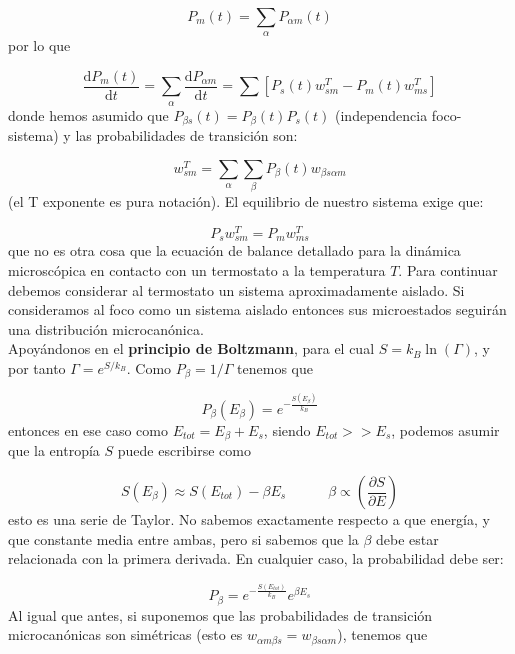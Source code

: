 \documentclass[12pt,a4paper]{article}
\numberwithin{equation}{section}
\numberwithin{figure}{section}
\newcommand{\tquad}{\quad \quad \quad}
\newcommand{\parentesis}[1]{\left( #1  \right)}
\newcommand{\parciales}[2]{\frac{\partial #1}{\partial #2}}
\newcommand{\pparciales}[2]{\parentesis{\parciales{#1}{#2}}}
\newcommand{\ccorchetes}[1]{\left[ #1  \right]}
\newcommand{\D}{\mathrm{d}}
\newcommand{\derivadas}[2]{\frac{\D #1}{\D #2}}
\theoremstyle{definition}
\begin{document}
\begin{equation}
P_m (t) = \sum_\alpha P_{\alpha m} (t)
\end{equation}
por lo que

\begin{equation}
\derivadas{P_m(t)}{t} = \sum_{\alpha} \derivadas{P_{\alpha m}}{t} = \sum \ccorchetes{P_s(t) w_{sm}^T - P_m (t) w_{ms}^T}
\end{equation}
donde hemos asumido  que $P_{\beta s} (t) = P_\beta (t) P_s (t)$ (independencia foco-sistema) y las probabilidades de transición son:

\begin{equation}
w_{sm}^T = \sum_\alpha \sum_\beta P_\beta (t) w_{\beta s \alpha m}
\end{equation}
(el T exponente es pura notación). El equilibrio de nuestro sistema exige que:

\begin{equation}
P_s w_{sm}^T = P_m w_{ms}^T   \label{Ec:1.4.020}
\end{equation}
que no es otra cosa que la ecuación de balance detallado para la dinámica microscópica en contacto con un termostato a la temperatura $T$. Para continuar debemos considerar al termostato un sistema aproximadamente aislado. Si consideramos al foco como un sistema aislado entonces sus microestados seguirán una distribución microcanónica. \\

Apoyándonos en el \textbf{principio de Boltzmann}, para el cual $S=k_B \ln ( \Gamma )$, y por tanto $\Gamma = e^{S / k_B}$. Como $P_\beta = 1/\Gamma$ tenemos que

\begin{equation}
P_\beta (E_\beta) = e^{- \frac{S (E_\beta)}{k_B}}
\end{equation}
entonces en ese caso como $E_{tot} = E_{\beta} + E_s$, siendo $E_{tot} >> E_s$, podemos asumir que la entropía $S$ puede escribirse como

\begin{equation}
S(E_{\beta}) \approx S(E_{tot}) - \beta E_s \tquad \beta \propto \pparciales{S}{E}
\end{equation}
esto es una serie de Taylor. No sabemos exactamente respecto a que energía, y que constante media entre ambas, pero si sabemos que la $\beta$ debe estar relacionada con la primera derivada. En cualquier caso, la probabilidad debe ser:
 
\begin{equation}
P_\beta = e^{-\frac{ S(E_{tot})}{k_B}} e^{\beta E_s} 
\end{equation}
Al igual que antes, si suponemos que las probabilidades de transición microcanónicas son simétricas (esto es $w_{\alpha m \beta s}=w_{\beta s \alpha m}$), tenemos que
\end{document}
